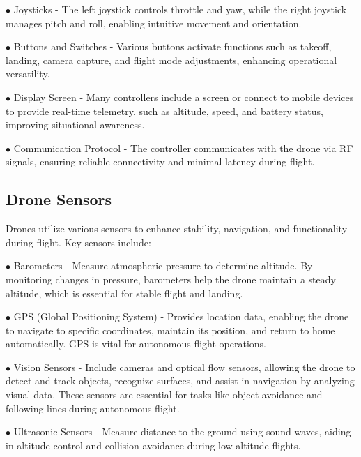 \documentclass[unnumsec,webpdf,modern,large]{mam-authoring-template}%
\begin{document}
\begin{description}
\item $\bullet$ Joysticks - The left joystick controls throttle and yaw, while the right joystick manages pitch and roll, enabling intuitive movement and orientation.

\item $\bullet$ Buttons and Switches - Various buttons activate functions such as takeoff, landing, camera capture, and flight mode adjustments, enhancing operational versatility.

\item $\bullet$ Display Screen - Many controllers include a screen or connect to mobile devices to provide real-time telemetry, such as altitude, speed, and battery status, improving situational awareness.

\item $\bullet$ Communication Protocol - The controller communicates with the drone via RF signals, ensuring reliable connectivity and minimal latency during flight.

\end{description}

\subsection{Drone Sensors} \label{sec}

Drones utilize various sensors to enhance stability, navigation, and functionality during flight. Key sensors include:

\begin{description}

\item $\bullet$ Barometers - Measure atmospheric pressure to determine altitude. By monitoring changes in pressure, barometers help the drone maintain a steady altitude, which is essential for stable flight and landing.

\item $\bullet$ GPS (Global Positioning System) - Provides location data, enabling the drone to navigate to specific coordinates, maintain its position, and return to home automatically. GPS is vital for autonomous flight operations.

\item $\bullet$ Vision Sensors - Include cameras and optical flow sensors, allowing the drone to detect and track objects, recognize surfaces, and assist in navigation by analyzing visual data. These sensors are essential for tasks like object avoidance and following lines during autonomous flight.

\item $\bullet$ Ultrasonic Sensors - Measure distance to the ground using sound waves, aiding in altitude control and collision avoidance during low-altitude flights.

\end{description}
\end{document}
